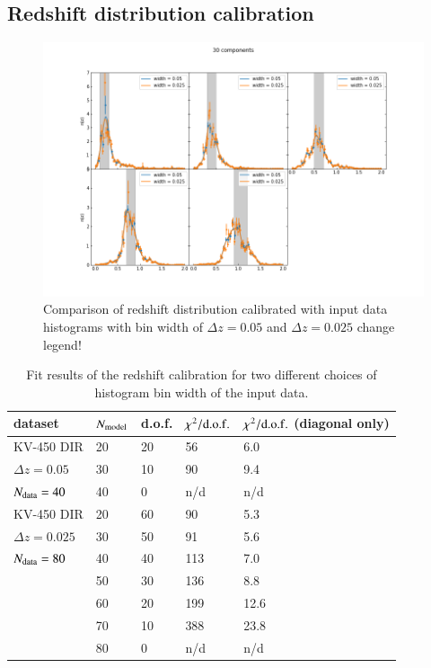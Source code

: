 \documentclass{aa}
\begin{document}
\begin{appendix} 
\section{Redshift distribution calibration}
\label{ap:calibration}
\begin{figure}
\label{fig:120vs240}
\centering
\includegraphics[scale=0.3]{plots/30.png}
\caption{Comparison of redshift distribution calibrated with input data histograms with bin width of $\Delta z = 0.05$ and $\Delta z = 0.025$ {\color{red} change legend!}}
\label{fig:comb_histogram_comparison}
\end{figure}
\begin{table}
\label{tab:redshift_calibration}
\begin{tabular}{lllll}
\hline
dataset & $N_{\rm model}$ & d.o.f. & $\chi^2/{\rm d.o.f.}$& $\chi^2/{\rm d.o.f.}$ (diagonal only)\\
\hline
KV-450 DIR&20&20&56&6.0\\
$\Delta z = 0.05$&30&10&90&9.4\\
$N_{\rm data} = 40$&40&0&n/d&n/d\\
\hline
KV-450 DIR&20&60&90&5.3\\
$\Delta z = 0.025$&30&50&91&5.6\\
$N_{\rm data} = 80$&40&40&113&7.0\\
&50&30&136&8.8\\
&60&20&199&12.6\\
&70&10&388&23.8\\
&80&0&n/d&n/d\\
\hline
\end{tabular}
\caption{Fit results of the redshift calibration for two different choices of histogram bin width of the input data. }
\end{table}

\end{appendix}
\end{document}
